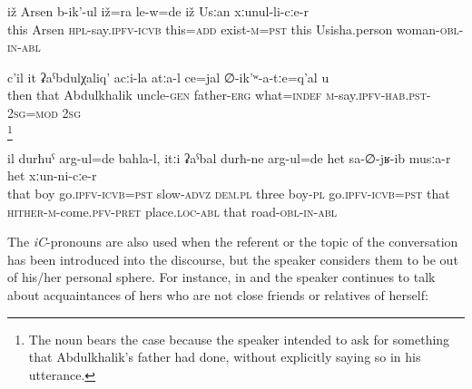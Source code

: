 \begin{exe}
	\ex	\label{And this man called Arsen, he was also there, with his wife from Usisha.}
	\gll	iž	Arsen	b-ik'-ul	iž=ra	le-w=de	iž	Usːan	xːunul-li-cːe-r\\
	this	Arsen	\textsc{hpl}-say.\textsc{ipfv}-\textsc{icvb} this=\textsc{add}	exist-\textsc{m}=\textsc{pst}	this	Usisha.person	woman-\textsc{obl}-\textsc{in}-\textsc{abl}\\
	\glt	{}

		\label{What did you say about uncle Abdulkhalik's father?}
	\sn
	\gll	c'il	it	ʡaˁbdulχaliq'	acːi-la	atːa-l	ce=jal	∅-ik'ʷ-a-tːe=q'al	u\\
		then	that	Abdulkhalik	uncle-\textsc{gen}	father-\textsc{erg}	what=\textsc{indef}	\textsc{m}-say.\textsc{ipfv}-\textsc{hab}.\textsc{pst}-\textsc{2sg}=\textsc{mod}	\textsc{2sg}\\
	\glt	{}\footnote{The noun  bears the  case because the speaker intended to ask for something that Abdulkhalik's father had done, without explicitly saying so in his utterance.}

		\label{And the boy went slowly away, and the three boys went there to that place, on that road.}
	\sn
	\gll	il	durħuˁ	arg-ul=de	bahla-l,	itːi	ʡaˁbal	durħ-ne	arg-ul=de	het	sa-∅-jʁ-ib	musːa-r het	xːun-ni-cːe-r\\
		that	boy	go.\textsc{ipfv}-\textsc{icvb}=\textsc{pst}	slow-\textsc{advz}	\textsc{dem.pl} three	boy-\textsc{pl}	go.\textsc{ipfv}-\textsc{icvb}=\textsc{pst}	that \textsc{hither-m}-come.\textsc{pfv}-\textsc{pret} place.\textsc{loc}-\textsc{abl} that	road-\textsc{obl-in}-\textsc{abl} \\
	\glt	{}

\end{exe}

The \textit{iC}-pronouns are also used when the referent or the topic of the conversation has been introduced into the discourse, but the speaker considers them to be out of his/her personal sphere. For instance, in  and  the speaker continues to talk about acquaintances of hers who are not close friends or relatives of herself:

